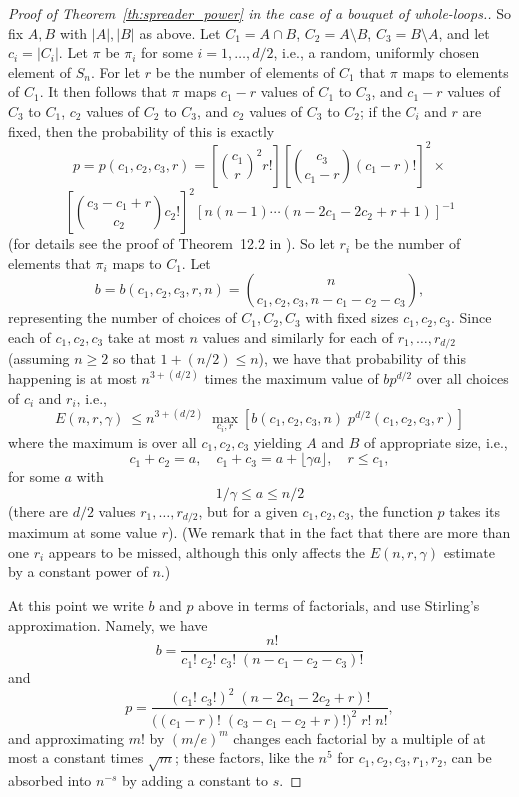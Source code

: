 \documentclass{memo-l}
\theoremstyle{plain}
\theoremstyle{definition}
\numberwithin{section}{chapter}
\numberwithin{equation}{chapter}
\theoremstyle{plain}
\theoremstyle{definition}
\begin{document}
\begin{proof}[Proof of Theorem~\ref{th:spreader_power} in the case of
a bouquet of whole-loops.]
So fix $A,B$ with $|A|,|B|$ as above.
Let $C_1=A\cap B$, $C_2=A\setminus B$, $C_3=B\setminus A$, and let
$c_i=|C_i|$.
Let $\pi$ be $\pi_i$ for some $i=1,\ldots,d/2$,
i.e., a random, uniformly
chosen element of $S_n$.
For let $r$ be the number of elements of $C_1$ that $\pi$
maps to elements of $C_1$.  It then follows that $\pi$
maps $c_1-r$ values of $C_1$ to $C_3$, and $c_1-r$ values of
$C_3$ to $C_1$, $c_2$ values of $C_2$ to $C_3$, and $c_2$ values of
$C_3$ to $C_2$; if the $C_i$ and $r$ are fixed, then the probability
of this is exactly
$$
p=p(c_1,c_2,c_3,r)=\left[ \binom{c_1}{r}^2 r! \right]
\left[ \binom{c_3}{c_1-r} (c_1-r)! \right]^2 \times
$$
$$
\left[ \binom{c_3-c_1+r}{c_2} c_2! \right]^2
\left[ n(n-1)\cdots(n-2c_1-2c_2+r+1)\right]^{-1} 
$$
(for details see the proof of Theorem~12.2 in \cite{friedman_alon}).
So let $r_i$ be the number of elements that $\pi_i$ maps to $C_1$.
Let
$$
b=b(c_1,c_2,c_3,r,n) = \binom{n}{c_1,c_2,c_3,n-c_1-c_2-c_3},
$$
representing the number of choices of $C_1,C_2,C_3$ with fixed
sizes $c_1,c_2,c_3$.
Since each of $c_1,c_2,c_3$ take at most $n$ values and similarly
for each of $r_1,\ldots,r_{d/2}$
(assuming $n\ge 2$ so that $1+(n/2)\le n$), we have that 
probability of this happening is at most $n^{3+(d/2)}$ times the
maximum value of $bp^{d/2}$ over all choices of $c_i$ and $r_i$, i.e.,
$$
E(n,r,\gamma)\ \le n^{3+(d/2)} \;
\max_{c_i,r} [b(c_1,c_2,c_3,n)
\; p^{d/2}(c_1,c_2,c_3,r) ]
$$
where the maximum is over all $c_1,c_2,c_3$ yielding $A$ and $B$ of 
appropriate size, i.e.,
$$
c_1+c_2=a,\quad
c_1+c_3=a+\lfloor \gamma a\rfloor,\quad
r \le c_1,
$$
for some $a$ with
$$
1/\gamma \le  a \le n/2
$$
(there are $d/2$ values $r_1,\ldots,r_{d/2}$, but for a given
$c_1,c_2,c_3$, the function $p$ takes its maximum at some value $r$).
(We remark that in \cite{friedman_alon} the fact that there are 
more than one $r_i$ appears to be missed, although this only affects
the $E(n,r,\gamma)$ estimate by a constant power of $n$.)

At this point we write $b$ and $p$ above in terms of factorials,
and use Stirling's approximation.  Namely, we have
$$
b=\frac{n!}{c_1!\;c_2!\;c_3!\;(n-c_1-c_2-c_3)!}
$$
and
$$
p=\frac{(c_1!\;c_3!)^2\;(n-2c_1-2c_2+r)!}{
\bigl( (c_1-r)!\;(c_3-c_1-c_2+r)!\bigr)^2\; r!\;n!},
$$
and approximating $m!$ by $(m/e)^m$ changes each factorial by
a multiple of at most a constant times $\sqrt{m}$; these factors,
like the $n^5$ for $c_1,c_2,c_3,r_1,r_2$, can be absorbed into 
$n^{-s}$ by adding a constant to $s$.


\end{proof}
\end{document}
